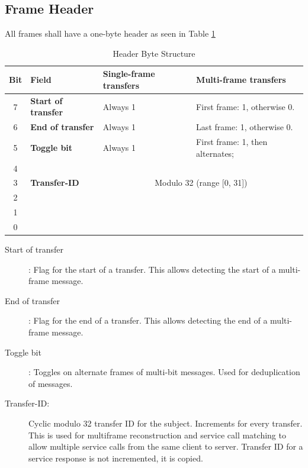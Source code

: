 \documentclass[a4paper,12pt]{article}
\begin{document}
\subsection{Frame Header}
All frames shall have a one-byte header as seen in Table \ref{tab:header-byte-structure}
\begin{table}[h]
\centering
\caption{Header Byte Structure}
\label{tab:header-byte-structure}
\renewcommand{\arraystretch}{1.3} %
\begin{tabular}[h]{|c|l|l|l|}
\hline
\textbf{Bit} & \textbf{Field} & \textbf{Single-frame transfers} & \textbf{Multi-frame transfers} \\
\hline
7 & \textbf{Start of transfer} & Always 1 & First frame: 1, otherwise 0. \\
\hline
6 & \textbf{End of transfer} & Always 1 & Last frame: 1, otherwise 0. \\
\hline
5 & \textbf{Toggle bit} & Always 1 & First frame: 1, then alternates; \\
\hline
4 & \multirow{3}{*}{\textbf{Transfer-ID}} & \multicolumn{2}{c|}{\multirow{3}{*}{\centering Modulo 32 (range [0, 31])}} \\
\cline{1-1}
3 & & \multicolumn{2}{c|}{} \\
\cline{1-1}
2 & & \multicolumn{2}{c|}{} \\
\cline{1-1}
1 &  & \multicolumn{2}{c|}{} \\
\cline{1-1}
0 &  & \multicolumn{2}{c|}{} \\
\hline
\end{tabular}
\end{table}

\begin{description}
    \item[Start of transfer]: Flag for the start of a transfer. This allows detecting the start of a multi-frame message.
    \item[End of transfer]: Flag for the end of a transfer. This allows detecting the end of a multi-frame message.
    \item[Toggle bit]: Toggles on alternate frames of multi-bit messages. Used for deduplication of messages.
    \item[Transfer-ID:] Cyclic modulo 32 transfer ID for the subject. Increments for every transfer. This is used for multiframe reconstruction 
    and service call matching to allow multiple service calls from the same client to server. Transfer ID for a service response is not incremented, 
    it is copied.
\end{description}
\end{document}
